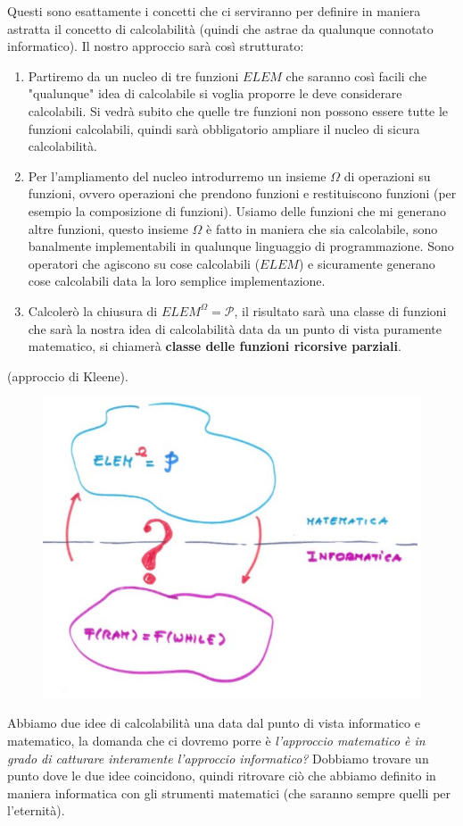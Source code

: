 \documentclass{article}
\begin{document}
Questi sono esattamente i concetti che ci serviranno per definire in maniera astratta il concetto
di calcolabilità (quindi che astrae da qualunque connotato informatico). Il nostro approccio
sarà così strutturato:
\begin{enumerate}
    \item Partiremo da un nucleo di tre funzioni $ELEM$ che saranno così facili che "qualunque"
          idea di calcolabile si voglia proporre le deve considerare calcolabili. Si vedrà
          subito che quelle tre funzioni non possono essere tutte le funzioni calcolabili, quindi
          sarà obbligatorio ampliare il nucleo di sicura calcolabilità.

    \item Per l'ampliamento del nucleo introdurremo un insieme $\Omega$ di operazioni su funzioni,
          ovvero operazioni che prendono funzioni e restituiscono funzioni (per esempio la
          composizione di funzioni). Usiamo delle funzioni che mi generano altre funzioni, questo
          insieme $\Omega$ è fatto in maniera che sia calcolabile, sono banalmente implementabili in
          qualunque linguaggio di programmazione. Sono operatori che agiscono su cose calcolabili ($ELEM$)
          e sicuramente generano cose calcolabili data la loro semplice implementazione.

    \item Calcolerò la chiusura di $ELEM^\Omega=\mathcal{P}$, il risultato sarà una classe di funzioni
          che sarà la nostra idea di calcolabilità data da un punto di vista puramente matematico, si chiamerà
          \textbf{classe delle funzioni ricorsive parziali}.
\end{enumerate}
(approccio di Kleene).
\begin{figure}[H]
    \centering
    \includegraphics[scale=0.5]{images/mat_info.png}
\end{figure}
Abbiamo due idee di calcolabilità una data dal punto di vista informatico e matematico, la domanda che ci
dovremo porre è \textit{l'approccio matematico è in grado di catturare interamente l'approccio informatico?}
Dobbiamo trovare un punto dove le due idee coincidono, quindi ritrovare ciò che abbiamo definito in maniera informatica
con gli strumenti matematici (che saranno sempre quelli per l'eternità).
\end{document}
